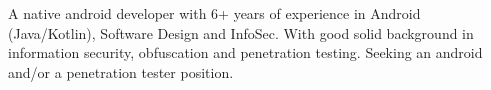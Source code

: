 

\begin{cvparagraph}

A native android developer with 6+ years of experience in Android (Java/Kotlin), Software Design and InfoSec. With good solid background in information security, obfuscation and penetration testing. Seeking an android and/or a penetration tester position.

\end{cvparagraph}
